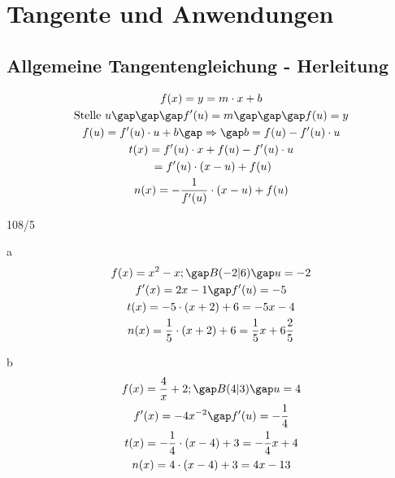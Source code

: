 \section{Tangente und Anwendungen}
\subsection{Allgemeine Tangentengleichung - Herleitung}
\begin{gather*}
  f(x) = y = m \cdot x + b \\
  \text{Stelle } u \gap\gap\gap f'(u) = m \gap\gap\gap f(u) = y \\
  f(u) = f'(u) \cdot u + b \gap\Rightarrow\gap b = f(u) - f'(u) \cdot u \\
  t(x) = f'(u) \cdot x + f(u) - f'(u) \cdot u \\
  \;= f'(u) \cdot (x - u) + f(u) \\
  n(x) = -\frac{1}{f'(u)} \cdot (x - u) + f(u)
\end{gather*}
\begin{exercise}{108/5}
  \item [a]
  \begin{gather*}
    f(x) = x^2 - x; \gap B(-2|6) \gap u = -2 \\
    f'(x) = 2x - 1 \gap f'(u) = -5 \\
    t(x) = -5 \cdot (x + 2) + 6 = -5x - 4 \\
    n(x) = \frac{1}{5} \cdot (x + 2) + 6 = \frac{1}{5}x + 6\frac{2}{5}
  \end{gather*}
  \item [b]
  \begin{gather*}
    f(x) = \frac{4}{x} + 2; \gap B(4|3) \gap u = 4 \\
    f'(x) = -4x^{-2} \gap f'(u) = -\frac{1}{4} \\
    t(x) = -\frac{1}{4} \cdot (x - 4) + 3 = -\frac{1}{4}x + 4 \\
    n(x) = 4 \cdot (x - 4) + 3 = 4x - 13
  \end{gather*}
\end{exercise}
